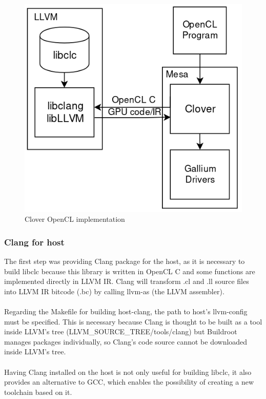 \documentclass[12pt,a4paper,oneside]{article}
\begin{document}
\begin{figure}[H]
\centering
  \includegraphics[scale=0.65]{img/clover.png}
  \caption{Clover OpenCL implementation}
  \label{fig:clover}
\end{figure}

\subsubsection*{Clang for host}
The first step was providing Clang package for the host, as it is necessary to
build libclc because this library is written in OpenCL C and some functions
are implemented directly in LLVM IR. Clang will transform .cl and .ll source
files into LLVM IR bitcode (.bc) by calling llvm-as (the LLVM assembler).\\\\
Regarding the Makefile for building host-clang, the path to host's llvm-config
must be specified. This is necessary because Clang is thought to be built as a
tool inside LLVM's tree (LLVM\_SOURCE\_TREE/tools/clang) but Buildroot manages
packages individually, so Clang's code source cannot be downloaded inside LLVM's
tree.\\\\
Having Clang installed on the host is not only useful for building libclc, it
also provides an alternative to GCC, which enables the possibility of creating
a new toolchain based on it.
\end{document}
